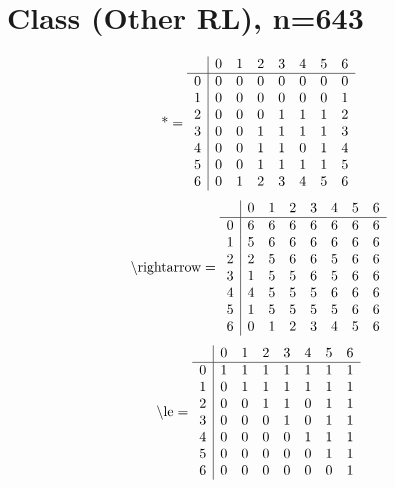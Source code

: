 \documentclass[11pt]{article}
\begin{document}
\section{Class (Other RL), n=643}
\[\text{*} = 
\begin{array}{r | r r r r r r r}
 & 0 & 1 & 2 & 3 & 4 & 5 & 6 \\ \hline
0 & 0 & 0 & 0 & 0 & 0 & 0 & 0 \\
1 & 0 & 0 & 0 & 0 & 0 & 0 & 1 \\
2 & 0 & 0 & 0 & 1 & 1 & 1 & 2 \\
3 & 0 & 0 & 1 & 1 & 1 & 1 & 3 \\
4 & 0 & 0 & 1 & 1 & 0 & 1 & 4 \\
5 & 0 & 0 & 1 & 1 & 1 & 1 & 5 \\
6 & 0 & 1 & 2 & 3 & 4 & 5 & 6 \\
\end{array}
\]
\[\text{\textbackslash rightarrow} = 
\begin{array}{r | r r r r r r r}
 & 0 & 1 & 2 & 3 & 4 & 5 & 6 \\ \hline
0 & 6 & 6 & 6 & 6 & 6 & 6 & 6 \\
1 & 5 & 6 & 6 & 6 & 6 & 6 & 6 \\
2 & 2 & 5 & 6 & 6 & 5 & 6 & 6 \\
3 & 1 & 5 & 5 & 6 & 5 & 6 & 6 \\
4 & 4 & 5 & 5 & 5 & 6 & 6 & 6 \\
5 & 1 & 5 & 5 & 5 & 5 & 6 & 6 \\
6 & 0 & 1 & 2 & 3 & 4 & 5 & 6 \\
\end{array}
\]
\[\text{\textbackslash le} = 
\begin{array}{r | r r r r r r r}
 & 0 & 1 & 2 & 3 & 4 & 5 & 6 \\ \hline
0 & 1 & 1 & 1 & 1 & 1 & 1 & 1 \\
1 & 0 & 1 & 1 & 1 & 1 & 1 & 1 \\
2 & 0 & 0 & 1 & 1 & 0 & 1 & 1 \\
3 & 0 & 0 & 0 & 1 & 0 & 1 & 1 \\
4 & 0 & 0 & 0 & 0 & 1 & 1 & 1 \\
5 & 0 & 0 & 0 & 0 & 0 & 1 & 1 \\
6 & 0 & 0 & 0 & 0 & 0 & 0 & 1 \\
\end{array}
\]
\end{document}
